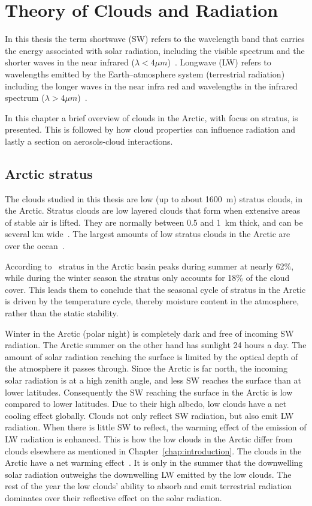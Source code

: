 \chapter{Theory of Clouds and Radiation}%
\label{chap:theory}
In this thesis the term shortwave (SW) refers to the wavelength band that carries the energy associated with solar radiation, including the visible spectrum and the shorter waves in the near infrared ($\lambda < 4\mu m$)~\citep{Wallace2006}. Longwave (LW) refers to wavelengths emitted by the Earth--atmosphere system (terrestrial radiation) including the longer waves in the near infra red and wavelengths in the infrared spectrum ($\lambda > 4\mu m$)~\citep{Wallace2006}. 

In this chapter a brief overview of clouds in the Arctic, with focus on stratus, is presented. This is followed by how cloud properties can influence radiation and lastly a section on aerosols-cloud interactions.

\section{Arctic stratus}
The clouds studied in this thesis are low (up to about 1600~m) stratus clouds, in the Arctic. Stratus clouds are low layered clouds that form when extensive areas of stable air is lifted. They are normally between 0.5 and 1~km thick, and can be several km wide~\citep{Aguado2010}. The largest amounts of low stratus clouds in the Arctic are over the ocean~\citep{Klein1993}.

According to~\citet{Klein1993} stratus in the Arctic basin peaks during summer at nearly 62\%, while during the winter season the stratus only accounts for 18\% of the cloud cover. This leads them to conclude that the seasonal cycle of stratus in the Arctic is driven by the temperature cycle, thereby moisture content in the atmosphere, rather than the static stability.

Winter in the Arctic (polar night) is completely dark and free of incoming SW radiation. The Arctic summer on the other hand has sunlight 24 hours a day. The amount of solar radiation reaching the surface is limited by the optical depth of the atmosphere it passes through. Since the Arctic is far north, the incoming solar radiation is at a high zenith angle, and less SW reaches the surface than at lower latitudes. Consequently the SW reaching the surface in the Arctic is low compared to lower latitudes. Due to their high albedo, low clouds have a net cooling effect globally. Clouds not only reflect SW radiation, but also emit LW radiation. When there is little SW to reflect, the warming effect of the emission of LW radiation is enhanced. This is how the low clouds in the Arctic differ from clouds elsewhere as mentioned in Chapter~\ref{chap:introduction}. The clouds in the Arctic have a net warming effect~\citep{Shupe2004}. It is only in the summer that the downwelling solar radiation outweighs the downwelling LW emitted by the low clouds. The rest of the year the low clouds' ability to absorb and emit terrestrial radiation dominates over their reflective effect on the solar radiation.

